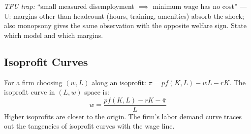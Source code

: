 \textit{TFU trap:} ``small measured disemployment $\implies$ minimum wage has no cost'' --- U: margins other than headcount (hours, training, amenities) absorb the shock; also monopsony gives the same observation with the opposite welfare sign. State which model and which margins.

\subsection{Isoprofit Curves}
For a firm choosing $(w, L)$ along an isoprofit: $\pi = pf(K,L) - wL - rK$. The isoprofit curve in $(L,w)$ space is:
$$w = \frac{pf(K,L) - rK - \bar{\pi}}{L}$$
Higher isoprofits are closer to the origin. The firm's labor demand curve traces out the tangencies of isoprofit curves with the wage line.
